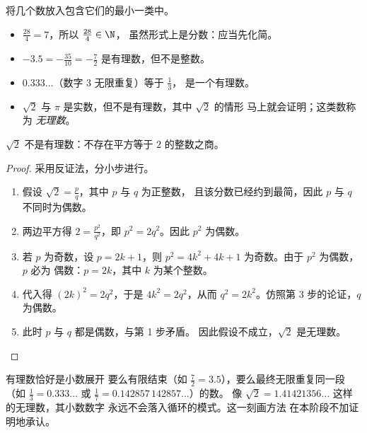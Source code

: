 \begin{example}\label{ex:g10:numbers:classify}
将几个数放入包含它们的最小一类中。
\begin{itemize}
  \item $\frac{28}{4} = 7$，所以 $\frac{28}{4} \in \N$，
        虽然形式上是分数：应当先化简。
  \item $-3.5 = -\frac{35}{10} = -\frac72$ 是有理数，但不是整数。
  \item $0.333\dots$（数字 $3$ 无限重复）等于 $\frac13$，
        是一个有理数。
  \item $\sqrt 2$ 与 $\pi$ 是实数，但不是有理数，其中 $\sqrt 2$ 的情形
        马上就会证明；这类数称为
        \emph{无理数}。
\end{itemize}
\end{example}

\begin{theorem}\label{thm:g10:numbers:sqrt2}
$\sqrt 2$ 不是有理数：不存在平方等于
$2$ 的整数之商。
\end{theorem}

\begin{proof}
采用反证法，分小步进行。
\begin{enumerate}
  \item 假设 $\sqrt 2 = \frac{p}{q}$，其中 $p$ 与 $q$ 为正整数，
        且该分数已经约到最简，因此 $p$ 与 $q$
        不同时为偶数。
  \item 两边平方得 $2 = \frac{p^2}{q^2}$，即
        $p^2 = 2q^2$。因此 $p^2$ 为偶数。
  \item 若 $p$ 为奇数，设 $p = 2k+1$，则
        $p^2 = 4k^2 + 4k + 1$ 为奇数。由于 $p^2$ 为偶数，$p$ 必为
        偶数：$p = 2k$，其中 $k$ 为某个整数。
  \item 代入得 $(2k)^2 = 2q^2$，于是 $4k^2 = 2q^2$，从而
        $q^2 = 2k^2$。仿照第 3 步的论证，$q$ 为偶数。
  \item 此时 $p$ 与 $q$ 都是偶数，与第 1 步矛盾。
        因此假设不成立，$\sqrt 2$ 是无理数。
\end{enumerate}
\end{proof}

\begin{remark}
有理数恰好是小数展开
要么有限结束（如 $\frac72 = 3.5$），要么最终无限重复同一段
（如 $\frac13 = 0.333\dots$ 或 $\frac{1}{7} = 0.142857\,142857\dots$）的数。
像 $\sqrt2 = 1.41421356\dots$ 这样的无理数，其小数数字
永远不会落入循环的模式。这一刻画方法
在本阶段不加证明地承认。
\end{remark}

